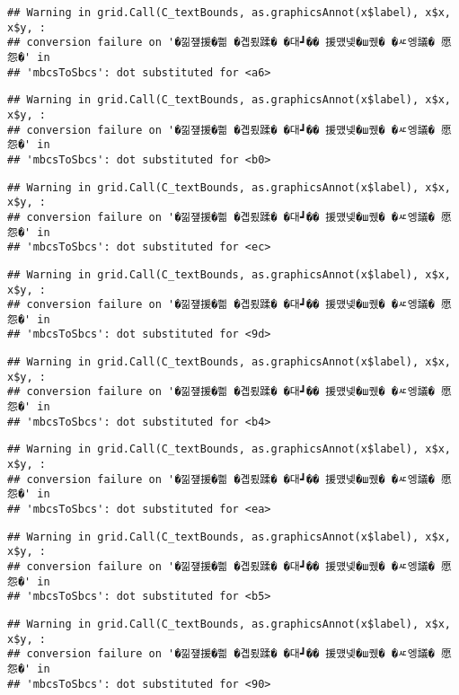\documentclass[
]{article}
\begin{document}
\begin{verbatim}
## Warning in grid.Call(C_textBounds, as.graphicsAnnot(x$label), x$x, x$y, :
## conversion failure on '�낆쟾援�쁾 �곕룄蹂� �대┛�� 援먰넻�ш퀬� �ㅼ엥議� 愿怨�' in
## 'mbcsToSbcs': dot substituted for <a6>
\end{verbatim}

\begin{verbatim}
## Warning in grid.Call(C_textBounds, as.graphicsAnnot(x$label), x$x, x$y, :
## conversion failure on '�낆쟾援�쁾 �곕룄蹂� �대┛�� 援먰넻�ш퀬� �ㅼ엥議� 愿怨�' in
## 'mbcsToSbcs': dot substituted for <b0>
\end{verbatim}

\begin{verbatim}
## Warning in grid.Call(C_textBounds, as.graphicsAnnot(x$label), x$x, x$y, :
## conversion failure on '�낆쟾援�쁾 �곕룄蹂� �대┛�� 援먰넻�ш퀬� �ㅼ엥議� 愿怨�' in
## 'mbcsToSbcs': dot substituted for <ec>
\end{verbatim}

\begin{verbatim}
## Warning in grid.Call(C_textBounds, as.graphicsAnnot(x$label), x$x, x$y, :
## conversion failure on '�낆쟾援�쁾 �곕룄蹂� �대┛�� 援먰넻�ш퀬� �ㅼ엥議� 愿怨�' in
## 'mbcsToSbcs': dot substituted for <9d>
\end{verbatim}

\begin{verbatim}
## Warning in grid.Call(C_textBounds, as.graphicsAnnot(x$label), x$x, x$y, :
## conversion failure on '�낆쟾援�쁾 �곕룄蹂� �대┛�� 援먰넻�ш퀬� �ㅼ엥議� 愿怨�' in
## 'mbcsToSbcs': dot substituted for <b4>
\end{verbatim}

\begin{verbatim}
## Warning in grid.Call(C_textBounds, as.graphicsAnnot(x$label), x$x, x$y, :
## conversion failure on '�낆쟾援�쁾 �곕룄蹂� �대┛�� 援먰넻�ш퀬� �ㅼ엥議� 愿怨�' in
## 'mbcsToSbcs': dot substituted for <ea>
\end{verbatim}

\begin{verbatim}
## Warning in grid.Call(C_textBounds, as.graphicsAnnot(x$label), x$x, x$y, :
## conversion failure on '�낆쟾援�쁾 �곕룄蹂� �대┛�� 援먰넻�ш퀬� �ㅼ엥議� 愿怨�' in
## 'mbcsToSbcs': dot substituted for <b5>
\end{verbatim}

\begin{verbatim}
## Warning in grid.Call(C_textBounds, as.graphicsAnnot(x$label), x$x, x$y, :
## conversion failure on '�낆쟾援�쁾 �곕룄蹂� �대┛�� 援먰넻�ш퀬� �ㅼ엥議� 愿怨�' in
## 'mbcsToSbcs': dot substituted for <90>
\end{verbatim}
\end{document}
